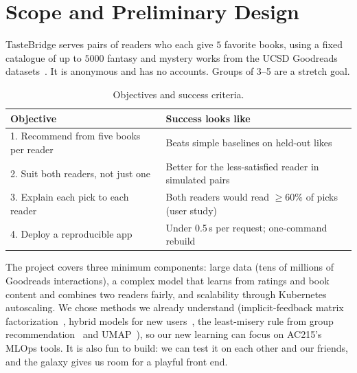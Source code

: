 \section*{Scope and Preliminary Design}

TasteBridge serves pairs of readers who each give
$5$ favorite books, using a fixed catalogue of up to $5000$ fantasy and mystery works from the UCSD Goodreads datasets~\cite{wan2018,wan2019}. It is anonymous and has no accounts. Groups of 3--5 are a stretch goal.

\begin{table}[H]
\centering
\small
\begin{tabular}{@{}ll@{}}
\toprule
\textbf{Objective} & \textbf{Success looks like} \\
\midrule
1. Recommend from five books per reader & Beats simple baselines on held-out likes \\
2. Suit both readers, not just one       & Better for the less-satisfied reader in simulated pairs \\
3. Explain each pick to each reader      & Both readers would read $\geq 60\%$ of picks (user study) \\
4. Deploy a reproducible app             & Under 0.5\,s per request; one-command rebuild \\
\bottomrule
\end{tabular}
\caption{Objectives and success criteria.}
\label{tab:objectives}
\end{table}

The project covers three minimum components: large data (tens of millions of
Goodreads interactions), a complex model that learns from ratings and book
content and combines two readers fairly, and scalability through Kubernetes
autoscaling. We chose methods we already understand (implicit-feedback matrix
factorization~\cite{hu2008}, hybrid models for new users~\cite{kula2015}, the
least-misery rule from group recommendation~\cite{dara2020} and
UMAP~\cite{mcinnes2018}), so our new learning can focus on AC215's MLOps tools.
It is also fun to build: we can test it on each other and our friends, and the
galaxy gives us room for a playful front end.

